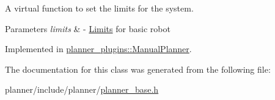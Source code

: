 A virtual function to set the limits for the system. 


\begin{DoxyParams}{Parameters}
{\em limits} & -\/ \hyperlink{structLimits}{Limits} for basic robot \\
\hline
\end{DoxyParams}


Implemented in \hyperlink{classplanner__plugins_1_1ManualPlanner_a6052550b915d9e96a6c8e094f3e85d2a}{planner\+\_\+plugins\+::\+Manual\+Planner}.



The documentation for this class was generated from the following file\+:\begin{DoxyCompactItemize}
\item 
planner/include/planner/\hyperlink{planner__base_8h}{planner\+\_\+base.\+h}\end{DoxyCompactItemize}
